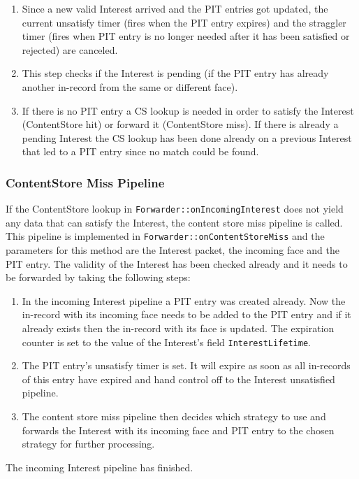 \begin{enumerate}
\item Since a new valid Interest arrived and the PIT entries got updated, the current unsatisfy timer (fires when the PIT entry expires) and the straggler timer (fires when PIT entry is no longer needed after it has been satisfied or rejected) are canceled.
\item This step checks if the Interest is pending (if the PIT entry has already another in-record from the same or different face).
\item If there is no PIT entry a CS lookup is needed in order to satisfy the Interest (ContentStore hit) or forward it (ContentStore miss). If there is already a pending Interest the CS lookup has been done already on a previous Interest that led to a PIT entry since no match could be found.
\end{enumerate}

\subsubsection{ContentStore Miss Pipeline}

If the ContentStore lookup in \texttt{Forwarder::onIncomingInterest} does not yield any data that can satisfy the Interest, the content store miss pipeline is called. This pipeline is implemented in \texttt{Forwarder::onContentStoreMiss} and the parameters for this method are the Interest packet, the incoming face and the PIT entry. The validity of the Interest has been checked already and it needs to be forwarded by taking the following steps:

\begin{enumerate}
\item In the incoming Interest pipeline a PIT entry was created already. Now the in-record with its incoming face needs to be added to the PIT entry and if it already exists then the in-record with its face is updated. The expiration counter is set to the value of the Interest's field \texttt{InterestLifetime}.
\item The PIT entry's unsatisfy timer is set. It will expire as soon as all in-records of this entry have expired and hand control off to the Interest unsatisfied pipeline.
\item The content store miss pipeline then decides which strategy to use and forwards the Interest with its incoming face and PIT entry to the chosen strategy for further processing.
\end{enumerate}

The incoming Interest pipeline has finished.

